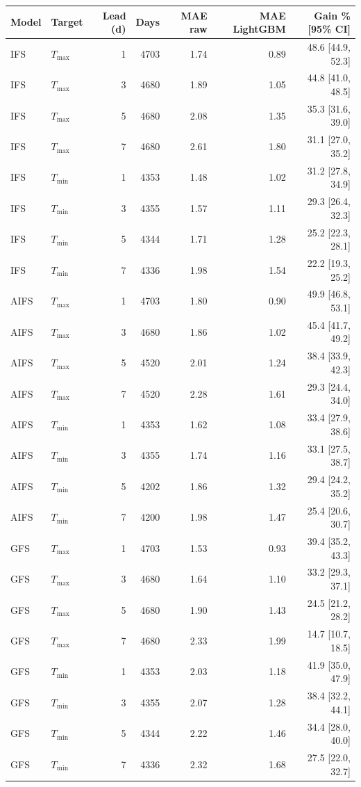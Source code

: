 \begin{tabular}{llrrrrr}
\toprule
Model & Target & Lead (d) & Days & MAE raw & MAE LightGBM & Gain \% [95\% CI] \\
\midrule
IFS & $T_{\max}$ & 1 & 4703 & 1.74 & 0.89 & 48.6 [44.9, 52.3] \\
IFS & $T_{\max}$ & 3 & 4680 & 1.89 & 1.05 & 44.8 [41.0, 48.5] \\
IFS & $T_{\max}$ & 5 & 4680 & 2.08 & 1.35 & 35.3 [31.6, 39.0] \\
IFS & $T_{\max}$ & 7 & 4680 & 2.61 & 1.80 & 31.1 [27.0, 35.2] \\
IFS & $T_{\min}$ & 1 & 4353 & 1.48 & 1.02 & 31.2 [27.8, 34.9] \\
IFS & $T_{\min}$ & 3 & 4355 & 1.57 & 1.11 & 29.3 [26.4, 32.3] \\
IFS & $T_{\min}$ & 5 & 4344 & 1.71 & 1.28 & 25.2 [22.3, 28.1] \\
IFS & $T_{\min}$ & 7 & 4336 & 1.98 & 1.54 & 22.2 [19.3, 25.2] \\
\midrule
AIFS & $T_{\max}$ & 1 & 4703 & 1.80 & 0.90 & 49.9 [46.8, 53.1] \\
AIFS & $T_{\max}$ & 3 & 4680 & 1.86 & 1.02 & 45.4 [41.7, 49.2] \\
AIFS & $T_{\max}$ & 5 & 4520 & 2.01 & 1.24 & 38.4 [33.9, 42.3] \\
AIFS & $T_{\max}$ & 7 & 4520 & 2.28 & 1.61 & 29.3 [24.4, 34.0] \\
AIFS & $T_{\min}$ & 1 & 4353 & 1.62 & 1.08 & 33.4 [27.9, 38.6] \\
AIFS & $T_{\min}$ & 3 & 4355 & 1.74 & 1.16 & 33.1 [27.5, 38.7] \\
AIFS & $T_{\min}$ & 5 & 4202 & 1.86 & 1.32 & 29.4 [24.2, 35.2] \\
AIFS & $T_{\min}$ & 7 & 4200 & 1.98 & 1.47 & 25.4 [20.6, 30.7] \\
\midrule
GFS & $T_{\max}$ & 1 & 4703 & 1.53 & 0.93 & 39.4 [35.2, 43.3] \\
GFS & $T_{\max}$ & 3 & 4680 & 1.64 & 1.10 & 33.2 [29.3, 37.1] \\
GFS & $T_{\max}$ & 5 & 4680 & 1.90 & 1.43 & 24.5 [21.2, 28.2] \\
GFS & $T_{\max}$ & 7 & 4680 & 2.33 & 1.99 & 14.7 [10.7, 18.5] \\
GFS & $T_{\min}$ & 1 & 4353 & 2.03 & 1.18 & 41.9 [35.0, 47.9] \\
GFS & $T_{\min}$ & 3 & 4355 & 2.07 & 1.28 & 38.4 [32.2, 44.1] \\
GFS & $T_{\min}$ & 5 & 4344 & 2.22 & 1.46 & 34.4 [28.0, 40.0] \\
GFS & $T_{\min}$ & 7 & 4336 & 2.32 & 1.68 & 27.5 [22.0, 32.7] \\
\bottomrule
\end{tabular}